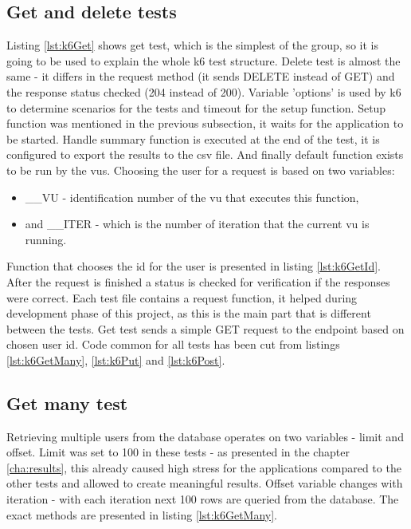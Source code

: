 \subsection{Get and delete tests}
Listing \ref{lst:k6Get} shows get test, which is the simplest of the group, so it is going to be used to explain the whole k6 test structure.
Delete test is almost the same - it differs in the request method (it sends DELETE instead of GET) and the response status checked (204 instead of 200).
Variable 'options' is used by k6 to determine scenarios for the tests and timeout for the setup function.
Setup function was mentioned in the previous subsection, it waits for the application to be started.
Handle summary function is executed at the end of the test, it is configured to export the results to the \acrshort{csv} file.
And finally default function exists to be run by the \acrshort{vu}s. Choosing the user for a request is based on two variables:
\begin{itemize}
    \item \_\_VU - identification number of the \acrshort{vu} that executes this function,
    \item and \_\_ITER - which is the number of iteration that the current \acrshort{vu} is running.
\end{itemize}
Function that chooses the id for the user is presented in listing \ref{lst:k6GetId}.
After the request is finished a status is checked for verification if the responses were correct.
Each test file contains a request function, it helped during development phase of this project, as this is the main part that is different between the tests.
Get test sends a simple GET request to the endpoint based on chosen user id.
Code common for all tests has been cut from listings \ref{lst:k6GetMany}, \ref{lst:k6Put} and \ref{lst:k6Post}.



\subsection{Get many test}
Retrieving multiple users from the database operates on two variables - limit and offset. Limit was set to 100 in these tests - as presented in the chapter \ref{cha:results}, this already caused high stress for the applications compared to the other tests and allowed to create meaningful results. Offset variable changes with iteration - with each iteration next 100 rows are queried from the database. The exact methods are presented in listing \ref{lst:k6GetMany}.


